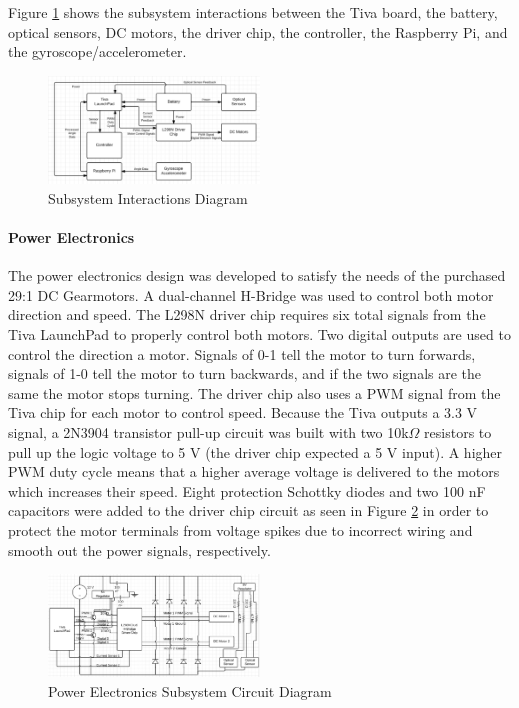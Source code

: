 \documentclass[11pt]{report}
\begin{document}
\begin{spacing}{1.5}
    Figure \ref{SubsystemInteraction} shows the subsystem interactions between the Tiva board, the battery, optical sensors, DC motors, the driver chip, the controller, the Raspberry Pi, and the gyroscope/accelerometer.
    
    \begin{figure}[H]
                \centering
                \includegraphics[width=0.5\textwidth]{SubsystemInteraction}
                \caption{Subsystem Interactions Diagram}
                \label{SubsystemInteraction}
            \end{figure}

        \paragraph{Power Electronics}
        
        The power electronics design was developed to satisfy the needs of the purchased 29:1 DC Gearmotors. A dual-channel H-Bridge was used to control both motor direction and speed. The L298N driver chip requires six total signals from the Tiva LaunchPad to properly control both motors. Two digital outputs are used to control the direction a motor. Signals of 0-1 tell the motor to turn forwards, signals of 1-0 tell the motor to turn backwards, and if the two signals are the same the motor stops turning. The driver chip also uses a PWM signal from the Tiva chip for each motor to control speed. Because the Tiva outputs a 3.3 V signal, a 2N3904 transistor pull-up circuit was built with two 10k$\Omega$ resistors to pull up the logic voltage to 5 V (the driver chip expected a 5 V input). A higher PWM duty cycle means that a higher average voltage is delivered to the motors which increases their speed. Eight protection Schottky diodes and two 100 nF capacitors were added to the driver chip circuit as seen in Figure \ref{PowerElectronics} in order to protect the motor terminals from voltage spikes due to incorrect wiring and smooth out the power signals, respectively. 
        
            \begin{figure}[H]
                \centering
                \includegraphics[width=0.5\textwidth]{PowerElectronics}
                \caption{Power Electronics Subsystem Circuit Diagram}
                \label{PowerElectronics}
            \end{figure}
        

\end{spacing}
\end{document}
